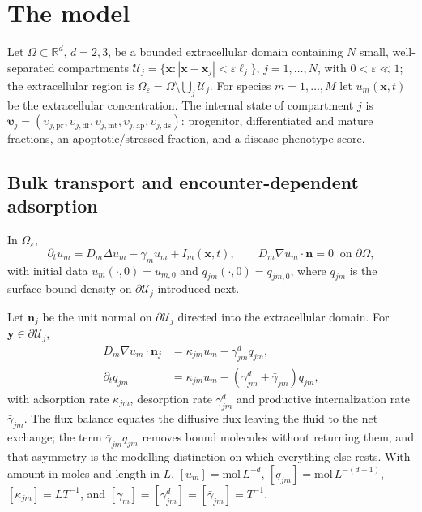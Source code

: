 \documentclass[pdflatex,sn-mathphys-num]{sn-jnl}
\numberwithin{equation}{section}
\theoremstyle{thmstyleone}%
\theoremstyle{definition}
\theoremstyle{remark}
\newcommand{\R}{\mathbb{R}}
\begin{document}
\section{The model}
\label{sec:model}

Let $\Omega\subset\R^d$, $d=2,3$, be a bounded extracellular domain containing $N$ small, well-separated compartments $\mathcal U_j=\{\mathbf x:|\mathbf x-\mathbf x_j|<\varepsilon\ell_j\}$, $j=1,\dots,N$, with $0<\varepsilon\ll1$; the extracellular region is $\Omega_\varepsilon=\Omega\setminus\bigcup_j\mathcal U_j$. For species $m=1,\dots,M$ let $u_m(\mathbf x,t)$ be the extracellular concentration. The internal state of compartment $j$ is $\boldsymbol\upsilon_j=(\upsilon_{j,\mathrm{pr}},\upsilon_{j,\mathrm{df}}, \upsilon_{j,\mathrm{mt}},\upsilon_{j,\mathrm{ap}},\upsilon_{j,\mathrm{ds}})$: progenitor, differentiated and mature fractions, an apoptotic/stressed fraction, and a disease-phenotype score.

\subsection{Bulk transport and encounter-dependent adsorption}
In $\Omega_\varepsilon$, 
\begin{equation}
\partial_tu_m=D_m\Delta u_m-\gamma_mu_m+I_m(\mathbf x,t),\qquad
D_m\nabla u_m\cdot\mathbf n=0\ \text{ on }\partial\Omega,
\label{eq:bulk}
\end{equation}
with initial data $u_m(\cdot,0)=u_{m,0}$ and $q_{jm}(\cdot,0)=q_{jm,0}$, where $q_{jm}$ is the surface-bound density on $\partial\mathcal U_j$ introduced next.

Let $\mathbf n_j$ be the unit normal on $\partial\mathcal U_j$ directed into the extracellular domain. For $\mathbf y\in\partial\mathcal U_j$, 
\begin{subequations}\label{eq:surface}
\begin{align}
D_m\nabla u_m\cdot\mathbf n_j&=\kappa_{jm}u_m-\gamma^d_{jm}q_{jm},\\
\partial_tq_{jm}&=\kappa_{jm}u_m-(\gamma^d_{jm}+\bar\gamma_{jm})q_{jm},
\end{align}
\end{subequations}
with adsorption rate $\kappa_{jm}$, desorption rate $\gamma^d_{jm}$ and productive internalization rate $\bar\gamma_{jm}$. The flux balance equates the diffusive flux leaving the fluid to the net exchange; the term $\bar\gamma_{jm}q_{jm}$ removes bound molecules without returning them, and that asymmetry is the modelling distinction on which everything else rests. With amount in moles and length in $L$, $[u_m]=\mathrm{mol}\,L^{-d}$, $[q_{jm}]=\mathrm{mol}\,L^{-(d-1)}$, $[\kappa_{jm}]=LT^{-1}$, and $[\gamma_m]=[\gamma^d_{jm}]=[\bar\gamma_{jm}]=T^{-1}$.
\end{document}
